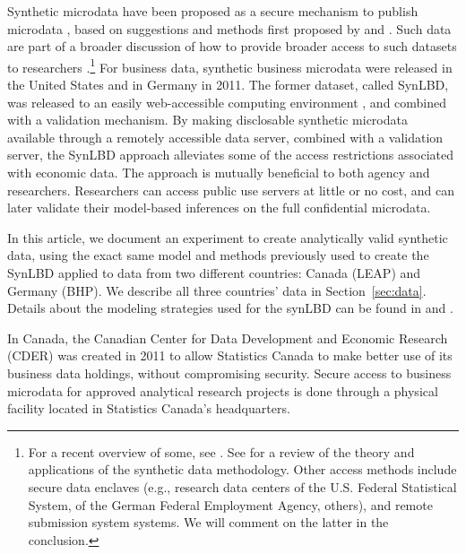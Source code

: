 Synthetic microdata have been proposed as a secure mechanism to publish microdata \citep{drechsler2008,RePEc:taf:japsta:v:39:y:2012:i:2:p:243-265,NAP11844,SJIAOS-2014c}, based on suggestions and methods first proposed by \citet{rubin93} and \citet{little93}. Such data are  part of a broader discussion of how  to provide broader access to such datasets to researchers  \citep{Bender2009,Vilhuber2013,AbowdLane2004,AbowdSchmutte_BPEA2015}.\footnote{
	For a recent overview of some, see \citet{VilhuberAbowdReiter:Synthetic:SJIAOS:2016}. See \citet{dre:2011} for a review of the theory and applications of the synthetic data methodology.
	Other access methods include secure data enclaves (e.g., research data centers of the U.S. Federal Statistical System, of the  German Federal Employment Agency, others), and  remote submission system systems. We will comment on the latter in the conclusion.  }
For business data, synthetic business microdata were released in the United States \citep{KinneyEtAl2011} and in Germany  \citep{RePEc:iab:iabfme:201101_de} in 2011. The former dataset, called \ac{SynLBD}, was  released to an easily web-accessible computing environment \citep{AbowdVilhuber2010}, and combined with a validation mechanism.  By making disclosable synthetic microdata available through a remotely accessible data server, combined with a validation server, the SynLBD approach alleviates some of the access restrictions associated with economic data. The approach is mutually beneficial to both agency and researchers. Researchers can access public use servers at little or no cost, and can later validate their model-based inferences on the full confidential microdata.


In this article, we document an experiment to create analytically valid synthetic data, using the exact same model and methods previously used to create the \ac{SynLBD} applied to data from two different countries: Canada (\ac{LEAP}) and Germany (\ac{BHP}). We describe all three countries' data in Section~\ref{sec:data}. Details about the modeling strategies used for the synLBD can be found in  \citet[henceforth KRRMJA]{KinneyEtAl2011} and \citet{RePEc:cen:tnotes:11-01}.


In Canada, the Canadian Center for Data Development and Economic Research (CDER) was created in 2011 to allow Statistics Canada to make better use of its business data holdings, without compromising security. Secure access  to business microdata for approved analytical research projects is done through a physical facility located in Statistics Canada’s headquarters. 

